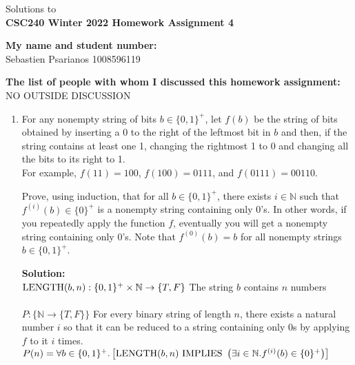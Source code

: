 \documentclass[11pt]{article}
\def\nats {{\mathbb N}}
\newcommand{\Implies}{\mbox{ IMPLIES }}
\begin{document}
\begin{center}
Solutions to\\
{\bf \Large \bf CSC240 Winter 2022 Homework Assignment 4}
\end{center}

\noindent
{\bf My name and student number:}\\
Sebastien Psarianos 1008596119

\medskip

\noindent
{\bf The list of people with whom I discussed this homework assignment:}\\
NO OUTSIDE DISCUSSION

\begin{enumerate}
\item
\begin{question}
For any nonempty string of bits $b \in \{0,1\}^+$,
let $f(b)$ be the string of bits obtained by
inserting a 0 to the right of the leftmost bit in $b$ and then, if the string contains at least one 1,
changing the rightmost 1 to 0 and changing all the bits to its right to 1.\\
For example, $f(11) = 100$, $f(100)  = 0111$, and $f(0111) = 00110$.

Prove, using induction, that for all $b \in \{0,1\}^+$,  there exists $i \in \nats$ such that $f^{(i)}(b) \in \{0\}^+$
 is a nonempty string containing only 0's.
In other words, if you repeatedly apply the function $f$, eventually you will get a nonempty string containing only 0's.
Note that $f^{(0)}(b) = b$ for all nonempty strings $b \in \{0,1\}^+$.
\end{question}

\begin{solution}
{\bf Solution:}\\
${\rm LENGTH}(b,n):\{0,1\}^+\times\nats\rightarrow \{T,F\}$ The string $b$ contains $n$ numbers\\\\
$P: \{\nats \rightarrow \{T,F\}\}$ For every binary string of length $n$, there exists a natural number $i$ so that it can be reduced to a string containing only $0$s by applying $f$ to it $i$ times.\\
$P(n)= \forall b\in\{0,1\}^+.\left[{\rm LENGTH}(b,n) \Implies \left(\exists i\in\nats.f^{(i)}(b)\in\{0\}^+\right)\right]$\\\\


\end{solution}
\end{enumerate}
\end{document}
